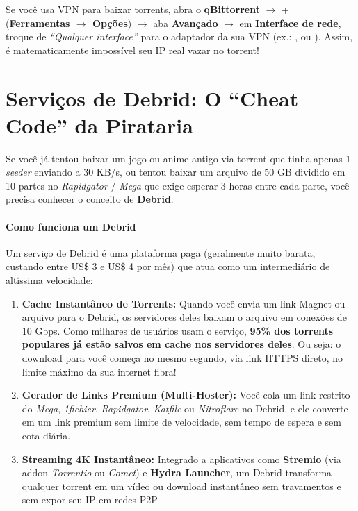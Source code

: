 \documentclass{pousadaguide}
\begin{document}
\begin{dica}
Se você usa VPN para baixar torrents, abra o \textbf{qBittorrent} $\rightarrow$ + (\textbf{Ferramentas $\rightarrow$ Opções}) $\rightarrow$ aba \textbf{Avançado} $\rightarrow$ em \textbf{Interface de rede}, troque de \emph{``Qualquer interface''} para o adaptador da sua VPN (ex.: ,  ou ). Assim, é matematicamente impossível seu IP real vazar no torrent!
\end{dica}

\section{Serviços de Debrid: O “Cheat Code” da Pirataria}

Se você já tentou baixar um jogo ou anime antigo via torrent que tinha apenas 1 \emph{seeder} enviando a 30 KB/s, ou tentou baixar um arquivo de 50 GB dividido em 10 partes no \emph{Rapidgator} / \emph{Mega} que exige esperar 3 horas entre cada parte, você precisa conhecer o conceito de \textbf{Debrid}.

\paragraph{Como funciona um Debrid}
Um serviço de Debrid é uma plataforma paga (geralmente muito barata, custando entre US\$ 3 e US\$ 4 por mês) que atua como um intermediário de altíssima velocidade:
\begin{enumerate}
  \item \textbf{Cache Instantâneo de Torrents:} Quando você envia um link Magnet ou arquivo  para o Debrid, os servidores deles baixam o arquivo em conexões de 10 Gbps. Como milhares de usuários usam o serviço, \textbf{95\% dos torrents populares já estão salvos em cache nos servidores deles}. Ou seja: o download para você começa no mesmo segundo, via link HTTPS direto, no limite máximo da sua internet fibra!
  \item \textbf{Gerador de Links Premium (Multi-Hoster):} Você cola um link restrito do \emph{Mega}, \emph{1fichier}, \emph{Rapidgator}, \emph{Katfile} ou \emph{Nitroflare} no Debrid, e ele converte em um link premium sem limite de velocidade, sem tempo de espera e sem cota diária.
  \item \textbf{Streaming 4K Instantâneo:} Integrado a aplicativos como \textbf{Stremio} (via addon \emph{Torrentio} ou \emph{Comet}) e \textbf{Hydra Launcher}, um Debrid transforma qualquer torrent em um vídeo ou download instantâneo sem travamentos e sem expor seu IP em redes P2P.
\end{enumerate}
\end{document}
